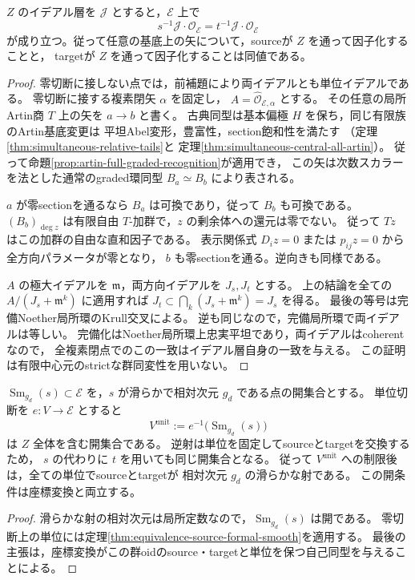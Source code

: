 \begin{corollary}[零切断のschemeとしての保存]
\label{cor:zero-section-scheme-saturated}
$Z$ のイデアル層を $\mathcal J$ とすると，$\mathcal E$ 上で
\[
       s^{-1}\mathcal J\cdot\mathcal O_{\mathcal E}
        =t^{-1}\mathcal J\cdot\mathcal O_{\mathcal E}
\]
が成り立つ。従って任意の基底上の矢について，sourceが $Z$ を通って因子化することと，
targetが $Z$ を通って因子化することは同値である。
\end{corollary}
\begin{proof}
零切断に接しない点では，前補題により両イデアルとも単位イデアルである。
零切断に接する複素閉矢 $\alpha$ を固定し，
$A=\widehat{\mathcal O}_{\mathcal E,\alpha}$ とする。
その任意の局所Artin商 $T$ 上の矢を $a\to b$ と書く。
古典同型は基本偏極 $H$ を保ち，同じ有限族のArtin基底変更は
平坦Abel変形，豊富性，section飽和性を満たす
（定理\ref{thm:simultaneous-relative-tails}と
定理\ref{thm:simultaneous-central-all-artin}）。
従って命題\ref{prop:artin-full-graded-recognition}が適用でき，
この矢は次数スカラーを法とした通常のgraded環同型 $B_a\simeq B_b$ により表される。

$a$ が零sectionを通るなら $B_a$ は可換であり，従って $B_b$ も可換である。
$(B_b)_{\deg z}$ は有限自由 $T$-加群で，$z$ の剰余体への還元は零でない。
従って $Tz$ はこの加群の自由な直和因子である。
表示関係式 $D_i z=0$ または $p_{ij}z=0$ から全方向パラメータが零となり，
$b$ も零sectionを通る。逆向きも同様である。

$A$ の極大イデアルを $\mathfrak m$，両方向イデアルを $J_s,J_t$ とする。
上の結論を全ての $A/(J_s+\mathfrak m^k)$ に適用すれば
$J_t\subset\bigcap_k(J_s+\mathfrak m^k)=J_s$ を得る。
最後の等号は完備Noether局所環のKrull交叉による。
逆も同じなので，完備局所環で両イデアルは等しい。
完備化はNoether局所環上忠実平坦であり，両イデアルはcoherentなので，
全複素閉点でのこの一致はイデアル層自身の一致を与える。
この証明は有限中心元のstrictな群同変性を用いない。
\end{proof}

\begin{proposition}[単位での滑らかなsourceを持つ基底開集合]
\label{prop:unit-source-smooth-open}
$\operatorname{Sm}_{g_d}(s)\subset\mathcal E$ を，$s$ が滑らかで相対次元 $g_d$ である点の開集合とする。
単位切断を $e:V\to\mathcal E$ とすると
\[
 V^{\mathrm{unit}}:=e^{-1}\bigl(\operatorname{Sm}_{g_d}(s)\bigr)
\]
は $Z$ 全体を含む開集合である。
逆射は単位を固定してsourceとtargetを交換するため，
$s$ の代わりに $t$ を用いても同じ開集合となる。
従って $V^{\mathrm{unit}}$ への制限後は，全ての単位でsourceとtargetが
相対次元 $g_d$ の滑らかな射である。
この開条件は座標変換と両立する。
\end{proposition}
\begin{proof}
滑らかな射の相対次元は局所定数なので，$\operatorname{Sm}_{g_d}(s)$ は開である。
零切断上の単位には定理\ref{thm:equivalence-source-formal-smooth}を適用する。
最後の主張は，座標変換がこの群oidのsource・targetと単位を保つ自己同型を与えることによる。
\end{proof}

